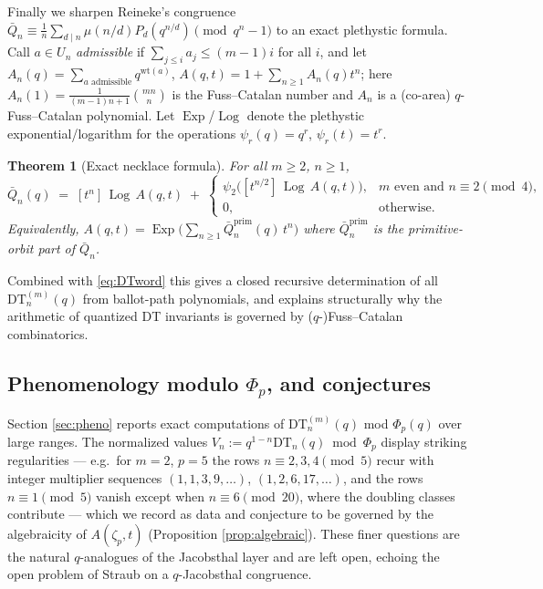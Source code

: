 \documentclass[11pt]{amsart}
\newtheorem{theorem}{Theorem}[section]
\theoremstyle{definition}
\newcommand{\DT}{\mathrm{DT}}
\newcommand{\wt}{\mathrm{wt}}
\newcommand{\prim}{\mathrm{prim}}
\newcommand{\Exp}{\operatorname{Exp}}
\newcommand{\PLog}{\operatorname{Log}}
\begin{document}
Finally we sharpen Reineke's congruence $\bar Q_n\equiv\frac1n\sum_{d\mid n}\mu(n/d)P_d(q^{n/d}) \pmod{q^n-1}$ to an exact plethystic formula. Call $a\in U_n$ \emph{admissible} if $\sum_{j\le i}a_j\le(m-1)i$ for all $i$, and let $A_n(q)=\sum_{a \text{ admissible}}q^{\wt(a)}$, $A(q,t)=1+\sum_{n\ge1}A_n(q)t^n$; here $A_n(1)=\frac1{(m-1)n+1}\binom{mn}n$ is the Fuss--Catalan number and $A_n$ is a (co-area) $q$-Fuss--Catalan polynomial. Let $\Exp$/$\PLog$ denote the plethystic exponential/logarithm for the operations $\psi_r(q)=q^r$, $\psi_r(t)=t^r$.

\begin{theorem}[Exact necklace formula]\label{thm:master}
For all $m\ge2$, $n\ge1$,
\[
\bar Q_n(q)\;=\;[t^n]\,\PLog\,A(q,t)\;+\;
\begin{cases}
\psi_2\Big([t^{n/2}]\,\PLog\,A(q,t)\Big), & m \text{ even and } n\equiv2\!\!\pmod 4,\\[1mm]
0,&\text{otherwise.}
\end{cases}
\]
Equivalently, $A(q,t)=\Exp\big(\sum_{n\ge1}\bar Q^{\prim}_n(q)\,t^n\big)$ where $\bar Q^{\prim}_n$ is the primitive-orbit part of $\bar Q_n$.
\end{theorem}

Combined with \eqref{eq:DTword} this gives a closed recursive determination of all $\DT^{(m)}_n(q)$ from ballot-path polynomials, and explains structurally why the arithmetic of quantized DT invariants is governed by ($q$-)Fuss--Catalan combinatorics.

\subsection{Phenomenology modulo $\Phi_p$, and conjectures}
Section \ref{sec:pheno} reports exact computations of $\DT^{(m)}_n(q)$ mod $\Phi_p(q)$ over large ranges. The normalized values $V_n:=q^{1-n}\DT_n(q)\bmod \Phi_p$ display striking regularities --- e.g.\ for $m=2$, $p=5$ the rows $n\equiv2,3,4 \pmod 5$ recur with integer multiplier sequences $(1,1,3,9,\dots)$, $(1,2,6,17,\dots)$, and the rows $n\equiv1\pmod5$ vanish except when $n\equiv6\pmod{20}$, where the doubling classes contribute --- which we record as data and conjecture to be governed by the algebraicity of $A(\zeta_p,t)$ (Proposition \ref{prop:algebraic}). These finer questions are the natural $q$-analogues of the Jacobsthal layer and are left open, echoing the open problem of Straub \cite[Rem.~6]{Straub} on a $q$-Jacobsthal congruence.
\end{document}
